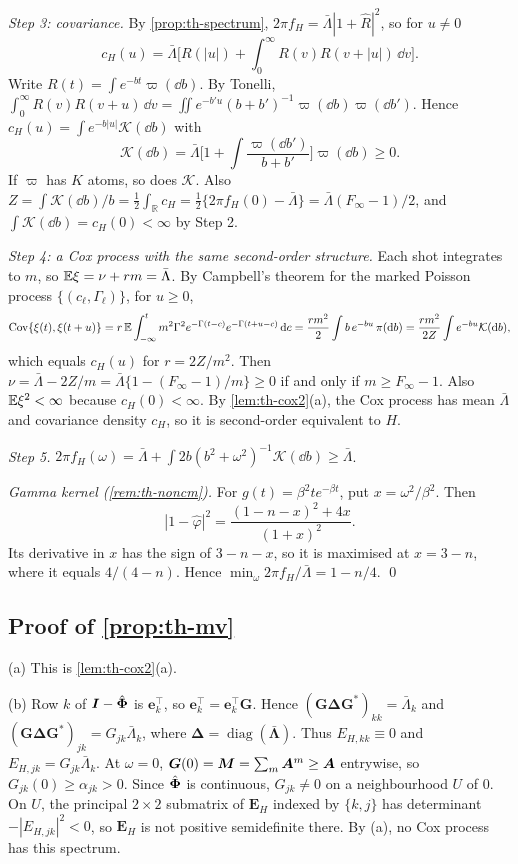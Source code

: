 \emph{Step 3: covariance.} By \cref{prop:th-spectrum},
$2\pi f_H=\bar\Lambda|1+\hat R|^2$, so for $u\ne0$
\[
c_H(u)=\bar\Lambda\Big[R(|u|)+\int_0^\infty R(v)R(v+|u|)\,\dd v\Big].
\]
Write $R(t)=\int e^{-bt}\varpi(\dd b)$. By Tonelli,
$\int_0^\infty R(v)R(v+u)\,\dd v=\iint e^{-b'u}(b+b')^{-1}\varpi(\dd b)\varpi(\dd b')$.
Hence $c_H(u)=\int e^{-b|u|}\mathcal K(\dd b)$ with
\[
\mathcal K(\dd b)=\bar\Lambda\Big[1+\int\frac{\varpi(\dd b')}{b+b'}\Big]\varpi(\dd b)\ge0 .
\]
If $\varpi$ has $K$ atoms, so does $\mathcal K$. Also
$Z=\int \mathcal K(\dd b)/b=\tfrac12\int_{\mathbb R}c_H=\tfrac12\{2\pi f_H(0)-\bar\Lambda\}=\bar\Lambda(F_\infty-1)/2$,
and $\int \mathcal K(\dd b)=c_H(0)<\infty$ by Step 2.

\emph{Step 4: a Cox process with the same second-order structure.} Each shot integrates
to $m$, so $\mathbb{E}\xi=\nu+r m=\bar\Lambda$. By Campbell's theorem for the marked Poisson
process $\{(c_\ell,\Gamma_\ell)\}$, for $u\ge0$,
\[
\operatorname{Cov}\{\xi(t),\xi(t+u)\}=r\,\mathbb{E}\int_{-\infty}^tm^2\Gamma^2e^{-\Gamma(t-c)}e^{-\Gamma(t+u-c)}\,\mathrm{d} c
=\frac{r m^2}{2}\int b\,e^{-bu}\,\pi(\mathrm{d} b)=\frac{r m^2}{2Z}\int e^{-bu}\mathcal K(\mathrm{d} b),
\]
which equals $c_H(u)$ for $r=2Z/m^2$. Then
$\nu=\bar\Lambda-2Z/m=\bar\Lambda\{1-(F_\infty-1)/m\}\ge0$ if and only if
$m\ge F_\infty-1$. Also $\mathbb{E}\xi^2<\infty$ because $c_H(0)<\infty$. By
\cref{lem:th-cox2}(a), the Cox process has mean $\bar\Lambda$ and covariance density
$c_H$, so it is second-order equivalent to $H$.

\emph{Step 5.} $2\pi f_H(\omega)=\bar\Lambda+\int2b(b^2+\omega^2)^{-1}\mathcal K(\dd b)\ge\bar\Lambda$.

\emph{Gamma kernel (\cref{rem:th-noncm}).} For $g(t)=\beta^2te^{-\beta t}$, put
$x=\omega^2/\beta^2$. Then
\[
|1-\hat\varphi|^2=\frac{(1-n-x)^2+4x}{(1+x)^2}.
\]
Its derivative in $x$ has the sign of $3-n-x$, so it is maximised at $x=3-n$, where it
equals $4/(4-n)$. Hence $\min_\omega2\pi f_H/\bar\Lambda=1-n/4$. \qed

\subsection{Proof of \texorpdfstring{\cref{prop:th-mv}}{Proposition (multivariate)}}

(a) This is \cref{lem:th-cox2}(a).

(b) Row $k$ of $\bm{I}-\hat{\bm{\Phi}}$ is $\bm e_k^{\top}$, so
$\bm e_k^{\top}=\bm e_k^{\top}\bm G$. Hence $(\bm G\bm\Delta\bm G^*)_{kk}=\bar\Lambda_k$ and
$(\bm G\bm\Delta\bm G^*)_{jk}=G_{jk}\bar\Lambda_k$, where
$\bm\Delta=\operatorname{diag}(\bar{\bm\Lambda})$. Thus $E_{H,kk}\equiv0$ and
$E_{H,jk}=G_{jk}\bar\Lambda_k$. At $\omega=0$,
$\bm G(0)=\bm{M}=\sum_m\bm{A}^m\ge\bm{A}$ entrywise, so $G_{jk}(0)\ge\alpha_{jk}>0$.
Since $\hat{\bm{\Phi}}$ is continuous, $G_{jk}\neq0$ on a neighbourhood $U$ of $0$. On $U$,
the principal $2\times2$ submatrix of $\bm E_H$ indexed by $\{k,j\}$ has determinant
$-|E_{H,jk}|^2<0$, so $\bm E_H$ is not positive semidefinite there. By (a), no Cox
process has this spectrum.

